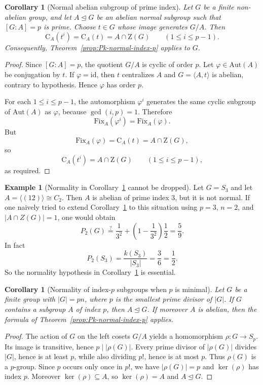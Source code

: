 \documentclass[11pt]{article}
\newtheorem{corollary}[theorem]{Corollary}
\theoremstyle{definition}
\theoremstyle{remark}
\theoremstyle{definition}
\newtheorem{example}[theorem]{Example}
\theoremstyle{plain}
\newcommand{\Z}{\mathrm{Z}}
\newcommand{\C}{\mathrm{C}}
\newcommand{\Aut}{\mathrm{Aut}}
\newcommand{\Fix}{\mathrm{Fix}}
\begin{document}
\begin{corollary}[Normal abelian subgroup of prime index]\label{prop:Pk-normal-index-p1}
Let $G$ be a finite non-abelian group, and let $A\trianglelefteq G$ be an abelian normal subgroup such that $[G:A]=p$ is prime.
Choose $t\in G$ whose image generates $G/A$.
Then
\[
\C_A(t^i)=\C_A(t)=A\cap \Z(G)\qquad (1\le i\le p-1).
\]
Consequently, Theorem~\ref{prop:Pk-normal-index-p} applies to $G$.
\end{corollary}

\begin{proof}
Since $[G:A]=p$, the quotient $G/A$ is cyclic of order $p$.
Let $\varphi\in \Aut(A)$ be conjugation by $t$.
If $\varphi=\mathrm{id}$, then $t$ centralizes $A$ and $G=\langle A,t\rangle$ is abelian, contrary to hypothesis.
Hence $\varphi$ has order $p$.

For each $1\le i\le p-1$, the automorphism $\varphi^i$ generates the same cyclic subgroup of $\Aut(A)$ as $\varphi$, because $\gcd(i,p)=1$.
Therefore
\[
\Fix_A(\varphi^i)=\Fix_A(\varphi).
\]
But
\[
\Fix_A(\varphi)=\C_A(t)=A\cap \Z(G),
\]
so
\[
\C_A(t^i)=A\cap \Z(G)\qquad (1\le i\le p-1),
\]
as required.
\end{proof}

\begin{example}[Normality in Corollary~\ref{prop:Pk-normal-index-p1} cannot be dropped]\label{ex:S3-index3-formula-fails}
Let $G=S_3$ and let $A=\langle(12)\rangle\cong C_2$.
Then $A$ is abelian of prime index $3$, but it is not normal.
If one naively tried to extend Corollary~\ref{prop:Pk-normal-index-p1} to this situation using $p=3$, $n=2$, and $|A\cap Z(G)|=1$, one would obtain
\[
P_2(G)\stackrel{?}{=} \frac{1}{3^2}+\left(1-\frac{1}{3^2}\right)\frac12=\frac59.
\]
In fact
\[
P_2(S_3)=\frac{k(S_3)}{|S_3|}=\frac{3}{6}=\frac12.
\]
So the normality hypothesis in Corollary~\ref{prop:Pk-normal-index-p1} is essential.
\end{example}

\begin{corollary}[Normality of index-$p$ subgroups when $p$ is minimal]\label{cor:index-p-normality}
Let $G$ be a finite group with $|G|=pn$, where $p$ is the smallest prime divisor of $|G|$.
If $G$ contains a subgroup $A$ of index $p$, then $A\trianglelefteq G$.
If moreover $A$ is abelian, then the formula of Theorem~\ref{prop:Pk-normal-index-p} applies.
\end{corollary}

\begin{proof}
    The action of $G$ on the left cosets $G/A$ yields a homomorphism $\rho\colon G\to S_p$.
Its image is transitive, hence $p\mid |\rho(G)|$.
Every prime divisor of $|\rho(G)|$ divides $|G|$, hence is at least $p$, while also dividing $p!$, hence is at most $p$.
Thus $\rho(G)$ is a $p$-group.
Since $p$ occurs only once in $p!$, we have $|\rho(G)|=p$ and $\ker(\rho)$ has index $p$.
Moreover $\ker(\rho)\subseteq A$, so $\ker(\rho)=A$ and $A\trianglelefteq G$.
\end{proof}
\end{document}

